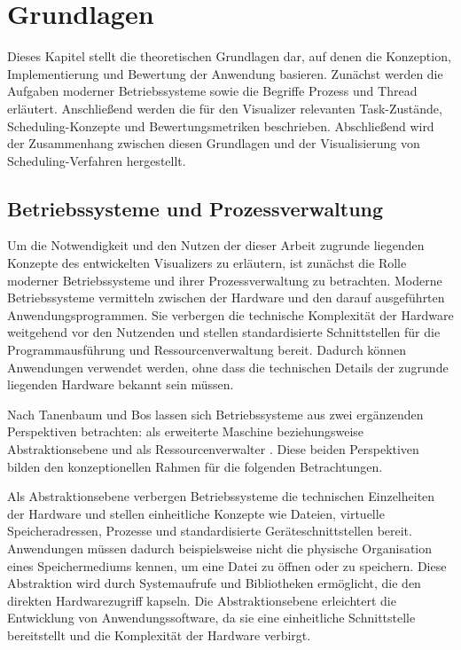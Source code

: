 \chapter{Grundlagen}

Dieses Kapitel stellt die theoretischen Grundlagen dar, auf denen die Konzeption, Implementierung und Bewertung der Anwendung basieren. Zunächst werden die Aufgaben moderner Betriebssysteme sowie die Begriffe Prozess und Thread erläutert. Anschließend werden die für den Visualizer relevanten Task-Zustände, Scheduling-Konzepte und Bewertungsmetriken beschrieben. Abschließend wird der Zusammenhang zwischen diesen Grundlagen und der Visualisierung von Scheduling-Verfahren hergestellt.

\section{Betriebssysteme und Prozessverwaltung}

Um die Notwendigkeit und den Nutzen der dieser Arbeit zugrunde liegenden Konzepte des entwickelten Visualizers zu erläutern, ist zunächst die Rolle moderner Betriebssysteme und ihrer Prozessverwaltung zu betrachten. Moderne Betriebssysteme vermitteln zwischen der Hardware und den darauf ausgeführten Anwendungsprogrammen. Sie verbergen die technische Komplexität der Hardware weitgehend vor den Nutzenden und stellen standardisierte Schnittstellen für die Programmausführung und Ressourcenverwaltung bereit. Dadurch können Anwendungen verwendet werden, ohne dass die technischen Details der zugrunde liegenden Hardware bekannt sein müssen.

Nach Tanenbaum und Bos lassen sich Betriebssysteme aus zwei ergänzenden Perspektiven betrachten: als erweiterte Maschine beziehungsweise Abstraktionsebene und als Ressourcenverwalter \cite{tanenbaum_moderne_betriebssysteme_de}. Diese beiden Perspektiven bilden den konzeptionellen Rahmen für die folgenden Betrachtungen.

Als Abstraktionsebene verbergen Betriebssysteme die technischen Einzelheiten der Hardware und stellen einheitliche Konzepte wie Dateien, virtuelle Speicheradressen, Prozesse und standardisierte Geräteschnittstellen bereit. Anwendungen müssen dadurch beispielsweise nicht die physische Organisation eines Speichermediums kennen, um eine Datei zu öffnen oder zu speichern. Diese Abstraktion wird durch Systemaufrufe und Bibliotheken ermöglicht, die den direkten Hardwarezugriff kapseln. Die Abstraktionsebene erleichtert die Entwicklung von Anwendungssoftware, da sie eine einheitliche Schnittstelle bereitstellt und die Komplexität der Hardware verbirgt.

